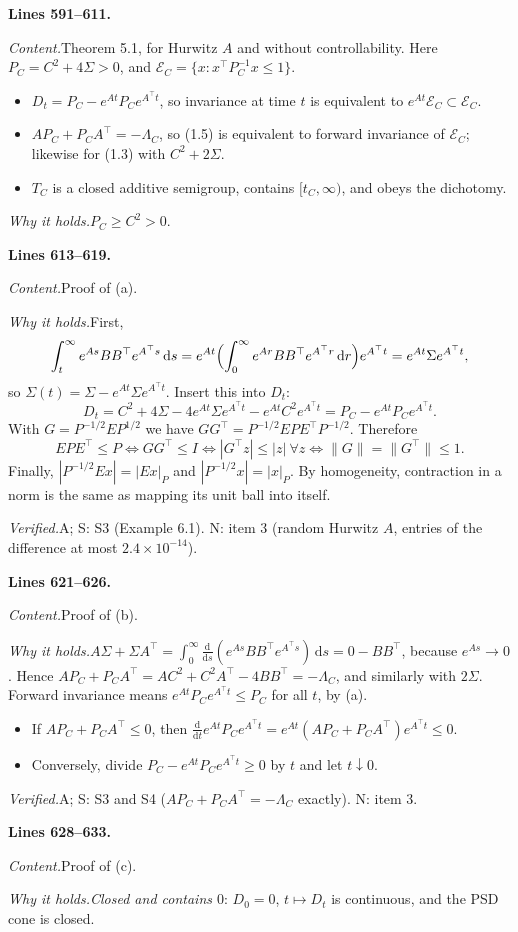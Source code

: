 \documentclass[11pt]{amsart}
\newcommand{\dd}{\,\mathrm{d}}
\newcommand{\tp}{\top}
\newcommand{\src}[1]{\par\bigskip\noindent\textbf{Lines #1.}\enspace}
\newcommand{\content}{\par\smallskip\noindent\textit{Content.}\enspace}
\newcommand{\why}{\par\smallskip\noindent\textit{Why it holds.}\enspace}
\newcommand{\verified}{\par\smallskip\noindent\textit{Verified.}\enspace}
\newcommand{\tA}{\textsf{A}}
\newcommand{\tS}{\textsf{S}}
\newcommand{\tN}{\textsf{N}}
\begin{document}
\src{591--611}
\content Theorem 5.1, for Hurwitz $A$ and without controllability. Here $P_C=C^2+4\Sigma>0$, and
$\mathcal E_C=\{x:x^\tp P_C^{-1}x\le1\}$.
\begin{itemize}
\item[(a)] $D_t=P_C-e^{At}P_Ce^{A^\tp t}$, so invariance at time $t$ is equivalent to $e^{At}\mathcal E_C\subset
\mathcal E_C$.
\item[(b)] $AP_C+P_CA^\tp=-\Lambda_C$, so (1.5) is equivalent to forward invariance of $\mathcal E_C$; likewise for
(1.3) with $C^2+2\Sigma$.
\item[(c)] $T_C$ is a closed additive semigroup, contains $[t_C,\infty)$, and obeys the dichotomy.
\end{itemize}
\why $P_C\ge C^2>0$.

\src{613--619}
\content Proof of (a).
\why First,
\[
\int_t^\infty e^{As}BB^\tp e^{A^\tp s}\dd s=e^{At}\Bigl(\int_0^\infty e^{Ar}BB^\tp e^{A^\tp r}\dd r\Bigr)e^{A^\tp
t}=e^{At}\Sigma e^{A^\tp t},
\]
so $\Sigma(t)=\Sigma-e^{At}\Sigma e^{A^\tp t}$. Insert this into $D_t$:
\[
D_t=C^2+4\Sigma-4e^{At}\Sigma e^{A^\tp t}-e^{At}C^2e^{A^\tp t}=P_C-e^{At}P_Ce^{A^\tp t}.
\]
With $G=P^{-1/2}EP^{1/2}$ we have $GG^\tp=P^{-1/2}EPE^\tp P^{-1/2}$. Therefore
\[
EPE^\tp\le P\iff GG^\tp\le I\iff|G^\tp z|\le|z|\ \forall z\iff\|G\|=\|G^\tp\|\le1 .
\]
Finally, $|P^{-1/2}Ex|=|Ex|_P$ and $|P^{-1/2}x|=|x|_P$. By homogeneity, contraction in a norm is the same as mapping
its unit ball into itself.
\verified \tA; \tS: S3 (Example 6.1). \tN: item 3 (random Hurwitz $A$, entries of the difference at most
$2.4\times10^{-14}$).

\src{621--626}
\content Proof of (b).
\why $A\Sigma+\Sigma A^\tp=\int_0^\infty\frac{\mathrm d}{\mathrm ds}(e^{As}BB^\tp e^{A^\tp s})\dd s=0-BB^\tp$,
because $e^{As}\to0$. Hence $AP_C+P_CA^\tp=AC^2+C^2A^\tp-4BB^\tp=-\Lambda_C$, and similarly with $2\Sigma$. Forward
invariance means $e^{At}P_Ce^{A^\tp t}\le P_C$ for all $t$, by (a).
\begin{itemize}
\item If $AP_C+P_CA^\tp\le0$, then $\frac{\mathrm d}{\mathrm dt}e^{At}P_Ce^{A^\tp t}=e^{At}(AP_C+P_CA^\tp)e^{A^\tp
t}\le0$.
\item Conversely, divide $P_C-e^{At}P_Ce^{A^\tp t}\ge0$ by $t$ and let $t\downarrow0$.
\end{itemize}
\verified \tA; \tS: S3 and S4 ($AP_C+P_CA^\tp=-\Lambda_C$ exactly). \tN: item 3.

\src{628--633}
\content Proof of (c).
\why \emph{Closed and contains $0$}: $D_0=0$, $t\mapsto D_t$ is continuous, and the PSD cone is closed.
\end{document}
